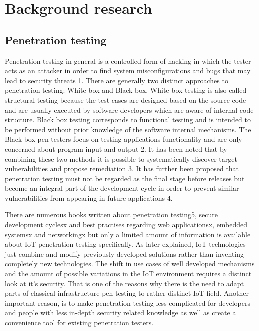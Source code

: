 \section{Background research}

\subsection{Penetration testing}
Penetration testing in general is a controlled form of hacking in which the tester acts as an attacker in order to find system misconfigurations and bugs that may lead to security threats {1}. There are generally two distinct approaches to penetration testing: White box and Black box. White box testing is also called structural testing because the test cases are designed based on the source code and are usually executed by software developers which are aware of internal code structure. Black box testing corresponds to functional testing and is intended to be performed without prior knowledge of the software internal mechanisms. The Black box pen testers focus on testing applications functionality and are only concerned about program input and output {2}. It has been noted that by combining these two methods it is possible to systematically discover target vulnerabilities and propose remediation {3}. It has further been proposed that penetration testing must not be regarded as the final stage before releases but become an integral part of the development cycle in order to prevent similar vulnerabilities from appearing in future applications {4}. 

There are numerous books written about penetration testing{5}, secure development cycles{x} and best practises regarding web applications{x}, embedded systems{x} and networking{x} but only a limited amount of information is available about IoT penetration testing specifically\cite{cookbook}. As later explained, IoT technologies just combine and modify previously developed solutions rather than inventing completely new technologies. The shift in use cases of well developed mechanisms and the amount of possible variations in the IoT environment requires a distinct look at it's security. That is one of the reasons why there is the need to adapt parts of classical infrastructure pen testing to rather distinct IoT field. Another important reason, is to make penetration testing less complicated for developers and people with less in-depth security related knowledge as well as create a convenience tool for existing penetration testers.

